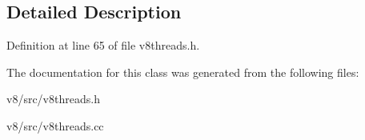 \subsection{Detailed Description}


Definition at line 65 of file v8threads.\+h.



The documentation for this class was generated from the following files\+:\begin{DoxyCompactItemize}
\item 
v8/src/v8threads.\+h\item 
v8/src/v8threads.\+cc\end{DoxyCompactItemize}
